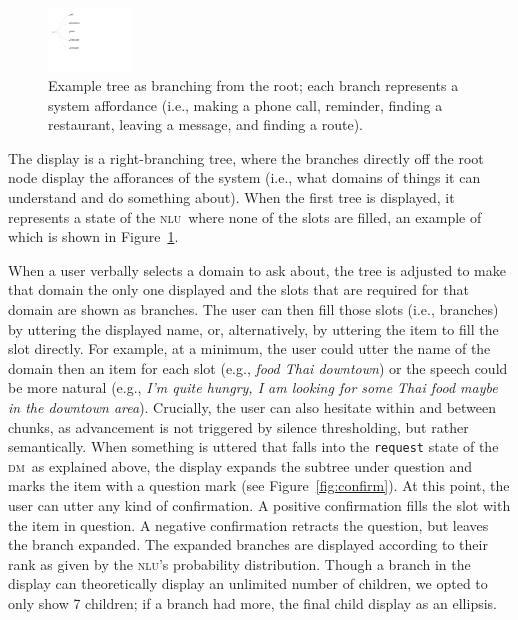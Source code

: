 \documentclass[11pt]{article}
\newcommand{\nlu}[0]{\textsc{nlu}}
\newcommand{\dm}[0]{\textsc{dm}}
\begin{document}
\begin{figure}
  \centering
      \includegraphics[width=0.2\textwidth]{figures/diatree-affordances.pdf}	
      \caption{Example tree as branching from the root; each branch represents a system affordance (i.e., making a phone call, reminder, finding a restaurant, leaving a message, and finding a route). \label{fig:affordances}}
\end{figure}

The display is a right-branching tree, where the branches directly off the root node display the afforances of the system (i.e., what domains of things it can understand and do something about). When the first tree is displayed, it represents a state of the \nlu\ where none of the slots are filled, an example of which is shown in Figure~\ref{fig:affordances}. 

When a user verbally selects a domain to ask about, the tree is adjusted to make that domain the only one displayed and the slots that are required for that domain are shown as branches. The user can then fill those slots (i.e., branches) by uttering the displayed name, or, alternatively, by uttering the item to fill the slot directly. For example, at a minimum, the user could utter the name of the domain then an item for each slot (e.g.,  \emph{food Thai downtown}) or the speech could be more natural (e.g., \emph{I'm quite hungry, I am looking for some Thai food maybe in the downtown area}). Crucially, the user can also hesitate within and between chunks, as advancement is not triggered by silence thresholding, but rather semantically.
When something is uttered that falls into the \texttt{request} state of the \dm\ as explained above, the display expands the subtree under question and marks the item with a question mark (see Figure~\ref{fig:confirm}). At this point, the user can utter any kind of confirmation. A positive confirmation fills the slot with the item in question. A negative confirmation retracts the question, but leaves the branch expanded. The expanded branches are displayed according to their rank as given by the \nlu's probability distribution. Though a branch in the display can theoretically display an unlimited number of children, we opted to only show 7 children; if a branch had more, the final child display as an ellipsis. 
\end{document}
